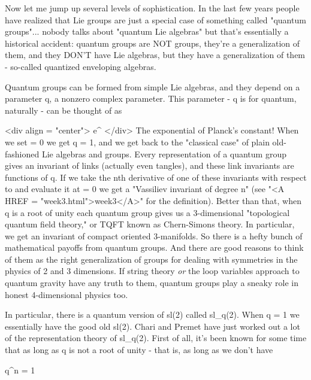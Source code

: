 Now let me jump up several levels of sophistication.  In the last few
years people have realized that Lie groups are just a special case of
something called "quantum groups"... nobody talks about "quantum Lie
algebras" but that's essentially a historical accident: quantum groups
are NOT groups, they're a generalization of them, and they DON'T have Lie
algebras, but they have a generalization of them - so-called
quantized enveloping algebras.  

Quantum groups can be formed from simple Lie algebras, and they depend
on a parameter q, a nonzero complex parameter.  This parameter - q is
for quantum, naturally - can be thought of as

<div align = "center">
e^{\hbar }
</div>
The exponential of Planck's constant!  When we set \hbar  = 0 we get q
= 1, and we get back to the "classical case" of plain old-fashioned
Lie algebras and groups.  Every representation of a quantum group
gives an invariant of links (actually even tangles), and these link
invariants are functions of q.  If we take the nth derivative of one
of these invariants with respect to \hbar  and evaluate it at \hbar  =
0 we get a "Vassiliev invariant of degree n" (see "<A HREF =
"week3.html">week3</A>" for the definition).  Better than that, when q
is a root of unity each quantum group gives us a 3-dimensional
"topological quantum field theory," or TQFT known as Chern-Simons
theory.  In particular, we get an invariant of compact oriented
3-manifolds.  So there is a hefty bunch of mathematical payoffs from
quantum groups.  And there are good reasons to think of them as the
right generalization of groups for dealing with symmetries in the
physics of 2 and 3 dimensions.  If string theory \emph{or} the loop
variables approach to quantum gravity have any truth to them, quantum
groups play a sneaky role in honest 4-dimensional physics too.

In particular, there is a quantum version of sl(2) called
sl_{q}(2).  When q = 1 we essentially have the good old sl(2).
Chari and Premet have just worked out a lot of the representation
theory of sl_{q}(2).  First of all, it's been known for some
time that as long as q is not a root of unity - that is, as long as we
don't have 

q^{n} = 1 

